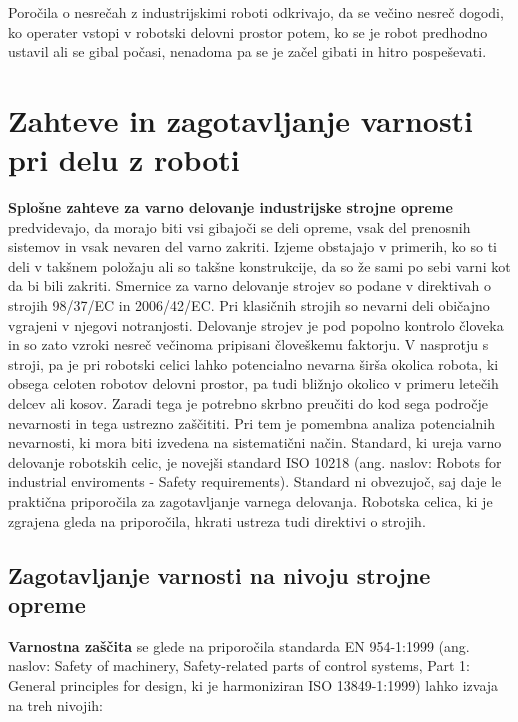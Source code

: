 Poročila o nesrečah z industrijskimi roboti odkrivajo, da se
večino nesreč dogodi, ko operater vstopi v robotski delovni
prostor potem, ko se je robot predhodno ustavil ali se gibal
počasi, nenadoma pa se je začel gibati in hitro pospeševati.

\clearpage
\section{Zahteve in zagotavljanje varnosti pri delu z roboti}

 \vspace{5mm}

\textbf{Splošne zahteve za varno delovanje industrijske strojne
opreme} predvidevajo, da morajo biti vsi gibajoči se deli opreme,
vsak del prenosnih sistemov in vsak nevaren del varno zakriti.
Izjeme obstajajo v primerih, ko so ti deli v takšnem položaju ali so
takšne konstrukcije, da so že sami po sebi varni kot da bi bili
zakriti. Smernice za varno delovanje strojev so podane v direktivah
o strojih 98/37/EC in 2006/42/EC. Pri klasičnih strojih so nevarni
deli običajno vgrajeni v njegovi notranjosti. Delovanje strojev je
pod popolno kontrolo človeka in so zato vzroki nesreč večinoma
pripisani človeškemu faktorju. V nasprotju s stroji, pa je pri
robotski celici lahko potencialno nevarna širša okolica robota, ki
obsega celoten robotov delovni prostor, pa tudi bližnjo okolico v
primeru letečih delcev ali kosov. Zaradi tega je potrebno skrbno
preučiti do kod sega področje nevarnosti in tega ustrezno zaščititi.
Pri tem je pomembna analiza potencialnih nevarnosti, ki mora biti
izvedena na sistematični način. Standard, ki ureja varno delovanje
robotskih celic, je novejši standard ISO 10218 (ang. naslov: Robots
for industrial enviroments - Safety requirements). Standard ni
obvezujoč, saj daje le praktična priporočila za zagotavljanje
varnega delovanja. Robotska celica, ki je zgrajena gleda na
priporočila, hkrati ustreza tudi direktivi o strojih.


\subsection{Zagotavljanje varnosti na nivoju strojne opreme}

 \vspace{5mm}

 \textbf{Varnostna zaščita} se glede na priporočila standarda
 EN 954-1:1999 (ang. naslov: Safety of machinery, Safety-related parts of
 control systems, Part 1: General principles for design, ki je
 harmoniziran ISO 13849-1:1999) lahko izvaja na treh nivojih:

